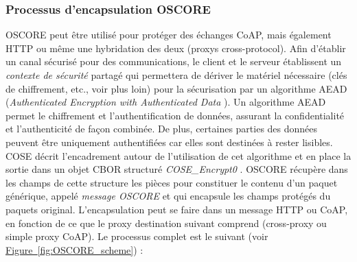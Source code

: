 \documentclass[]{report}
\newcommand{\wordlink}[2]{\hyperref[#2]{#1~\ref{#2}}}
\begin{document}
\newpage

\subsubsection{Processus d'encapsulation OSCORE}

\par OSCORE peut être utilisé pour protéger des échanges CoAP, mais également HTTP ou même une hybridation des deux (proxys cross-protocol). Afin d'établir un canal sécurisé pour des communications, le client et le serveur établissent un \textit{contexte de sécurité} partagé qui permettera de dériver le matériel nécessaire (clés de chiffrement, etc., voir plus loin) pour la sécurisation par un algorithme AEAD (\textit{Authenticated Encryption with Authenticated Data} \cite{rfc5116}). Un algorithme AEAD permet le chiffrement et l'authentification de données, assurant la confidentialité et l'authenticité de façon combinée. De plus, certaines parties des données peuvent être uniquement authentifiées car elles sont destinées à rester lisibles. COSE décrit l'encadrement autour de l'utilisation de cet algorithme et en place la sortie dans un objet CBOR structuré \textit{COSE\_Encrypt0}  \cite{rfc8152}. OSCORE récupère dans les champs de cette structure les pièces pour constituer le contenu d'un paquet générique, appelé \textit{message OSCORE} et qui encapsule les champs protégés du paquets original. L'encapsulation peut se faire dans un message HTTP ou CoAP, en fonction de ce que le proxy destination suivant comprend (cross-proxy ou simple proxy CoAP). Le processus complet est le suivant (voir \wordlink{Figure}{fig:OSCORE_scheme}) :
\end{document}
